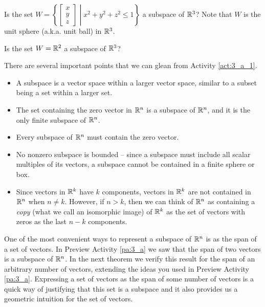 \begin{activity}
\item Is the set $W = \left\{ \left[ \begin{array}{c} x \\ y \\ z \end{array} \right] \middle| x^2+y^2+z^2 \leq 1\right\}$ a subspace of $\mathbb{R}^3$? Note that $W$ is the unit sphere (a.k.a. unit ball) in $\mathbb{R}^3$.



\item Is the set $W = \mathbb{R}^2$ a subspace of $\mathbb{R}^3$?



\ea
\end{activity}



There are several important points that we can glean from Activity \ref{act:3_a_1}. 
\begin{itemize}
\item A subspace is a vector space within a larger vector space, similar to a subset being a set within a larger set.
\item The set containing the zero vector in $\mathbb{R}^n$ is a subspace of $\mathbb{R}^n$, and it is the only finite subspace of $\mathbb{R}^n$.
\item Every subspace of $\mathbb{R}^n$ must contain the zero vector.
\item No nonzero subspace is bounded -- since a subspace must include all scalar multiples of its vectors, a subspace cannot be contained in a finite sphere or box. 
\item Since vectors in $\mathbb{R}^k$ have $k$ components, vectors in $\mathbb{R}^k$ are not contained in $\mathbb{R}^n$ when $n \neq k$. However, if $n > k$, then we can think of $\mathbb{R}^n$ as containing a \emph{copy} (what we call an isomorphic image) of $\mathbb{R}^k$ as the set of vectors with zeros as the last $n-k$ components. 
\end{itemize}
 

\label{sec:sub_space_span}

One of the most convenient ways to represent a subspace of $\mathbb{R}^n$ is as the span of a set of vectors. In Preview Activity \ref{pa:3_a} we saw that the span of two vectors is a subspace of $\mathbb{R}^n$. In the next theorem we verify this result for the span of an arbitrary number of vectors, extending the ideas you used in Preview Activity \ref{pa:3_a}. Expressing a set of vectors as the span of some number of vectors is a quick way of justifying that this set is a subspace and it also provides us a geometric intuition for the set of vectors.



